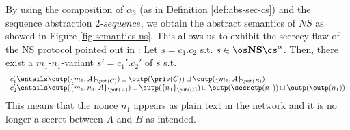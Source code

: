 \documentclass{tlp}
\begin{document}
By using the composition of  $\alpha_3$ (as in Definition \ref{def:abs-sec-cs}) and the sequence abstraction $2$-$sequence$, we  obtain the abstract semantics of ${NS}$ as showed in  Figure \ref{fig:semantics-ns}. This allows us  to exhibit the  secrecy flaw of the NS protocol pointed out in \cite{lowe95attack}: 
Let $s=c_1.c_2$ s.t. $s  \in \os \mathbf{NS}\cs^{\alpha}$. Then, there exist a $m_1$-$n_1$-variant $s'=c_1'.c_2'$ of $s$ s.t.
 \[
\begin{array}{l}
c_1'  \entails   \outp(\{m_1,A\}_{\pub(C)}) \sqcup \outp(\priv(C)) \sqcup \outp(\{m_1,A\}_{\pub(B)})\\
c_2'  \entails  \outp(\{m_1,n_1,A\}_{\pub(A)}) \sqcup \outp(\{n_1\}_{\pub(C)}) \sqcup \outp(\secretp(n_1)) \sqcup \outp(\outp(n_1))
\end{array}
\]
This means that the nonce $n_1$ appears as plain text in the network and it is no longer a secret between $A$ and $B$ as intended. 
\end{document}
